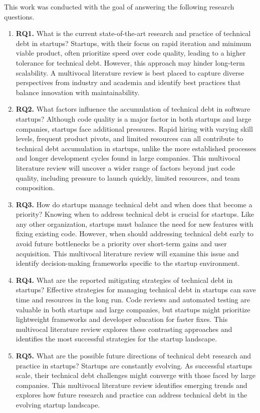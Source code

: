 This work was conducted with the goal of answering the following research questions.
\begin{enumerate}
\item \textbf{RQ1.} What is the current state-of-the-art research and practice of technical debt in startups? Startups, with their focus on rapid iteration and minimum viable product, often prioritize speed over code quality, leading to a higher tolerance for technical debt. However, this approach may hinder long-term scalability. A multivocal literature review is best placed to capture diverse perspectives from industry and academia and identify best practices that balance innovation with maintainability.
\item \textbf{RQ2.} What factors influence the accumulation of technical debt in software startups? Although code quality is a major factor in both startups and large companies, startups face additional pressures. Rapid hiring with varying skill levels, frequent product pivots, and limited resources can all contribute to technical debt accumulation in startups, unlike the more established processes and longer development cycles found in large companies. This multivocal literature review will uncover a wider range of factors beyond just code quality, including pressure to launch quickly, limited resources, and team composition.
\item \textbf{RQ3.} How do startups manage technical debt and when does that become a priority? Knowing when to address technical debt is crucial for startups. Like any other organization, startups must balance the need for new features with fixing existing code. However, when should addressing technical debt early to avoid future bottlenecks be a priority over short-term gains and user acquisition. This multivocal literature review will examine this issue and identify decision-making frameworks specific to the startup environment.
\item \textbf{RQ4.} What are the reported mitigating strategies of technical debt in startups? Effective strategies for managing technical debt in startups can save time and resources in the long run. Code reviews and automated testing are valuable in both startups and large companies, but startups might prioritize lightweight frameworks and developer education for faster fixes. This multivocal literature review explores these contrasting approaches and identifies the most successful strategies for the startup landscape.
\item \textbf{RQ5.} What are the possible future directions of technical debt research and practice in startups? Startups are constantly evolving. As successful startups scale, their technical debt challenges might converge with those faced by large companies. This multivocal literature review identifies emerging trends and explores how future research and practice can address technical debt in the evolving startup landscape.

\end{enumerate}


